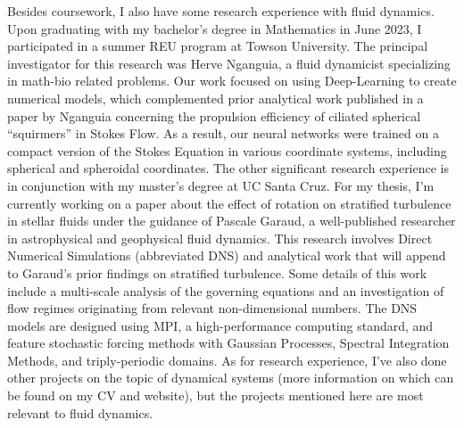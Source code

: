 \documentclass{article}
\begin{document}
Besides coursework, I also have some research experience with fluid dynamics. Upon graduating with my bachelor's degree in Mathematics in June 2023, I participated in a summer REU program at Towson University. The principal investigator for this research was Herve Nganguia, a fluid dynamicist specializing in math-bio related problems. Our work focused on using Deep-Learning to create numerical models, which complemented prior analytical work published in a paper by Nganguia concerning the propulsion efficiency of ciliated spherical ``squirmers'' in Stokes Flow. As a result, our neural networks were trained on a compact version of the Stokes Equation in various coordinate systems, including spherical and spheroidal coordinates. The other significant research experience is in conjunction with my master's degree at UC Santa Cruz. For my thesis, I'm currently working on a paper about the effect of rotation on stratified turbulence in stellar fluids under the guidance of Pascale Garaud, a well-published researcher in astrophysical and geophysical fluid dynamics. This research involves Direct Numerical Simulations (abbreviated DNS) and analytical work that will append to Garaud's prior findings on stratified turbulence. Some details of this work include a multi-scale analysis of the governing equations and an investigation of flow regimes originating from relevant non-dimensional numbers. The DNS models are designed using MPI, a high-performance computing standard, and feature stochastic forcing methods with Gaussian Processes, Spectral Integration Methods, and triply-periodic domains. As for research experience, I've also done other projects on the topic of dynamical systems (more information on which can be found on my CV and website), but the projects mentioned here are most relevant to fluid dynamics.
 
\end{document}
